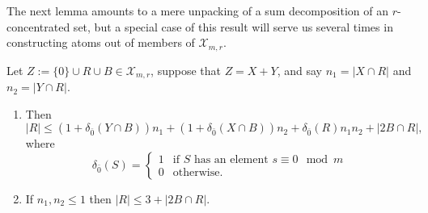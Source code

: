 The next lemma amounts to a mere unpacking of a sum decomposition of an $r$-concentrated set, but a special case of this result will serve us several times in constructing atoms out of members of $\mathcal{X}_{m,r}$.

\begin{lemma} \label{lem:both summands small}
Let $Z := \{0\}\cup R \cup B\in \mathcal{X}_{m,r}$, suppose that $Z = X + Y$, and say $n_1 = |X\cap R|$ and $n_2 = |Y\cap R|$.
\begin{enumerate}[label={\rm (\roman{*})}]
\item Then 
\[|R| \le (1+\delta_{\bar{0}}(Y\cap B))n_1 + (1+\delta_{\bar{0}}(X\cap B))n_2 + \delta_{\bar{0}}(R)n_1n_2 + |2B \cap R|,\]
where 
\[\delta_{\bar{0}}(S) = 
\begin{cases}
1& \textrm{if $S$ has an element $s \equiv 0 \mod m$} \\
0& \textrm{otherwise}.
\end{cases}\]
\item If $n_1,n_2 \le 1$ then $|R| \le 3 + |2B\cap R|$.
\end{enumerate}
\end{lemma}

